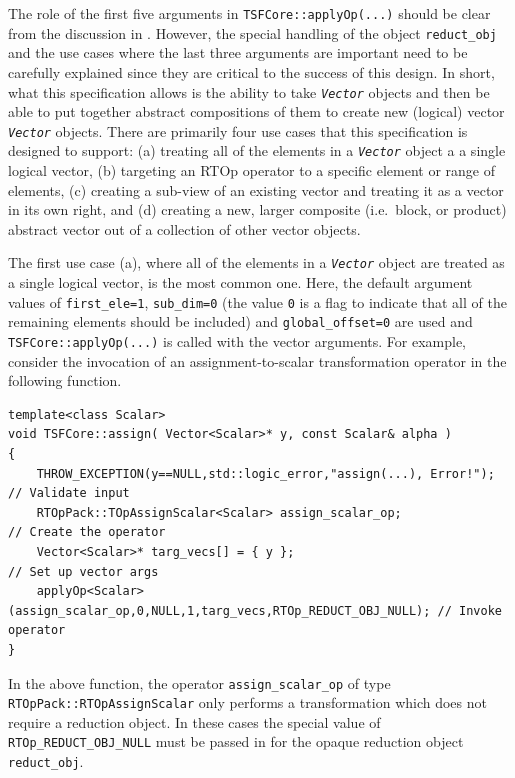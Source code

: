The role of the first five arguments in \texttt{TSFCore::applyOp(\-...)}
should be clear from the discussion in \cite{ref:rtop_toms}.  However,
the special handling of the object \texttt{reduct\_obj} and the use
cases where the last three arguments are important need to be
carefully explained since they are critical to the success of this
design.  In short, what this specification allows is the ability to
take \texttt{\textit{Vector}} objects and then be able to put together
abstract compositions of them to create new (logical) vector
\texttt{\textit{Vector}} objects.  There are primarily four use cases
that this specification is designed to support: (a) treating all of
the elements in a \texttt{\textit{Vector}} object a a single logical
vector, (b) targeting an RTOp operator to a specific element or range
of elements, (c) creating a sub-view of an existing vector and
treating it as a vector in its own right, and (d) creating a new,
larger composite (i.e.~block, or product) abstract vector out of a
collection of other vector objects.

The first use case (a), where all of the elements in a
\texttt{\textit{Vector}} object are treated as a single logical
vector, is the most common one.  Here, the default argument values of
\texttt{first\_ele=1}, \texttt{sub\_dim=0} (the value \texttt{0} is a
flag to indicate that all of the remaining elements should be
included) and \texttt{global\_offset=0} are used and
\texttt{TSFCore::applyOp(\-...)} is called with the vector arguments.
For example, consider the invocation of an assignment-to-scalar
transformation operator in the following function.

{\scriptsize\begin{verbatim}
template<class Scalar>
void TSFCore::assign( Vector<Scalar>* y, const Scalar& alpha )
{
    THROW_EXCEPTION(y==NULL,std::logic_error,"assign(...), Error!");           // Validate input
    RTOpPack::TOpAssignScalar<Scalar> assign_scalar_op;                        // Create the operator
    Vector<Scalar>* targ_vecs[] = { y };                                       // Set up vector args
    applyOp<Scalar>(assign_scalar_op,0,NULL,1,targ_vecs,RTOp_REDUCT_OBJ_NULL); // Invoke operator
}
\end{verbatim}}

\noindent In the above function, the operator \texttt{assign\_scalar\_op} of type
\texttt{RTOpPack::RTOpAssignScalar} only performs a transformation which
does not require a reduction object.  In these cases the special value
of \texttt{RTOp\_REDUCT\_OBJ\_NULL} must be passed in for the
opaque reduction object \texttt{reduct\_obj}.

